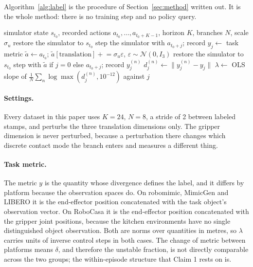 Algorithm~\ref{alg:label} is the procedure of Section~\ref{sec:method} written
out. It is the whole method: there is no training step and no policy query.

\begin{algorithm}[h]
\caption{Open-loop stability label at one state}
\label{alg:label}
\begin{algorithmic}[1]
\Require simulator state $s_{t_0}$, recorded actions $a_{t_0},\dots,a_{t_0+K-1}$,
         horizon $K$, branches $N$, scale $\sigma_u$
\State restore the simulator to $s_{t_0}$
  \State step the simulator with $a_{t_0+j}$; record $y_j \gets$ task metric
\EndFor
{}
  \State $\tilde a \gets a_{t_0}$; \; $\tilde a[\text{translation}] \mathrel{+}= \sigma_u \varepsilon$,
         \; $\varepsilon \sim \mathcal{N}(0, I_3)$
  \State restore the simulator to $s_{t_0}$
    \State step with $\tilde a$ if $j = 0$ else $a_{t_0+j}$; record $y^{(n)}_j$
    \State $d^{(n)}_j \gets \lVert y^{(n)}_j - y_j \rVert$
  \EndFor
\EndFor
\State \Return $\lambda \gets$ OLS slope of
       $\frac{1}{N}\sum_n \log \max(d^{(n)}_j, 10^{-12})$ against $j$
\end{algorithmic}
\end{algorithm}

\paragraph{Settings.}
Every dataset in this paper uses $K{=}24$, $N{=}8$, a stride of 2 between
labeled stamps, and perturbs the three translation dimensions only. The gripper
dimension is never perturbed, because a perturbation there changes which
discrete contact mode the branch enters and measures a different thing.

\paragraph{Task metric.}
The metric $y$ is the quantity whose divergence defines the label, and it
differs by platform because the observation spaces do. On robomimic, MimicGen
and LIBERO it is the end-effector position concatenated with the task object's
observation vector. On RoboCasa it is the end-effector position concatenated
with the gripper joint positions, because the kitchen environments have no
single distinguished object observation. Both are norms over quantities in
metres, so $\lambda$ carries units of inverse control steps in both cases.
The change of metric between platforms means $\delta$, and therefore the
unstable fraction, is not directly comparable across the two groups; the
within-episode structure that Claim 1 rests on is.

